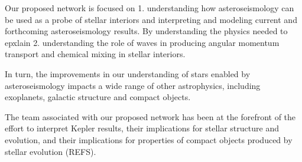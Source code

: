 Our proposed network is focused on 1.  understanding how asteroseismology can be used as a probe of stellar interiors and interpreting and modeling current and forthcoming asteroseismology results.  By understanding the physics needed to epxlain 
2.  understanding the role of waves in producing angular momentum transport and chemical mixing in stellar interiors.    

In turn, the improvements in our understanding of stars enabled by asteroseismology impacts a wide range of other astrophysics, including exoplanets, galactic structure and compact objects.   


The team associated with our proposed network has been at the forefront of the effort to interpret Kepler results, their implications for stellar structure and evolution, and their implications for properties of compact objects produced by stellar evolution (REFS).   
